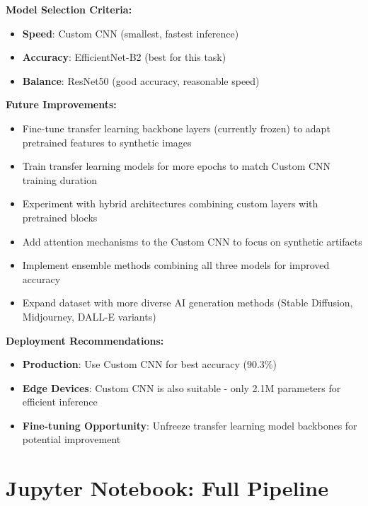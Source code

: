 \documentclass[man,12pt,letterpaper,donotrepeattitle,floatsintext]{apa7}
\begin{document}
\textbf{Model Selection Criteria:}
\begin{itemize}
    \item \textbf{Speed}: Custom CNN (smallest, fastest inference)
    \item \textbf{Accuracy}: EfficientNet-B2 (best for this task)
    \item \textbf{Balance}: ResNet50 (good accuracy, reasonable speed)
\end{itemize}

\textbf{Future Improvements:}
\begin{itemize}
    \item Fine-tune transfer learning backbone layers (currently frozen) to adapt pretrained features to synthetic images
    \item Train transfer learning models for more epochs to match Custom CNN training duration
    \item Experiment with hybrid architectures combining custom layers with pretrained blocks
    \item Add attention mechanisms to the Custom CNN to focus on synthetic artifacts
    \item Implement ensemble methods combining all three models for improved accuracy
    \item Expand dataset with more diverse AI generation methods (Stable Diffusion, Midjourney, DALL-E variants)
\end{itemize}

\textbf{Deployment Recommendations:}
\begin{itemize}
    \item \textbf{Production}: Use Custom CNN for best accuracy (90.3\%)
    \item \textbf{Edge Devices}: Custom CNN is also suitable - only 2.1M parameters for efficient inference
    \item \textbf{Fine-tuning Opportunity}: Unfreeze transfer learning model backbones for potential improvement
\end{itemize}

\newpage


\newpage
\appendix

\section{Jupyter Notebook: Full Pipeline}

\end{document}
